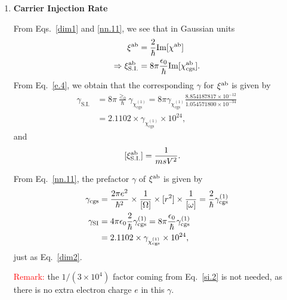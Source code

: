 \documentclass[12pt]{article}
\numberwithin{equation}{section}
\begin{document}
\begin{enumerate}
\item {\bf Carrier Injection Rate}

From Eqs.~\eqref{dim1} and \eqref{nn.11}, we see that 
in Gaussian units
 \begin{align}\label{dim2}
\xi^{\mathrm{a}\mathrm{b}}
&=\frac{2}{\hbar}\mathrm{Im}[\chi^{\mathrm{a}\mathrm{b}}]
\nonumber\\
\Rightarrow  
\xi^{\mathrm{a}\mathrm{b}}_{\mathrm{S.I.}}
&=8\pi\frac{\epsilon_0}{\hbar}\mathrm{Im}[\chi^{\mathrm{a}\mathrm{b}}_{\mathrm{cgs}}]
. 
\end{align}   
From Eq.~\eqref{e.4}, we obtain that the corresponding $\gamma$ for 
$\xi^{\mathrm{a}\mathrm{b}}$ is given by
 \begin{align}\label{dim2}
\gamma _{\mathrm{S.I.}}
&=8\pi\frac{\ge_0}{\hbar}
\gamma_{\chi^{(1)}_{\mathrm{cgs}}} 
=
8\pi\gamma_{\chi^{(1)}_{\mathrm{cgs}}} \frac{8.854 187 817 \times 10^{-12}}{1.054571800\times 10^{-34}}
\nonumber\\
&=
2.1102 \times  
\gamma_{\chi^{(1)}_{\mathrm{cgs}}} 
\times 10^{24}
, 
\end{align} 
and 
 \begin{align}\label{dim21}
[\xi^{\mathrm{a}\mathrm{b}}_{\mathrm{S.I.}}]
&=
\frac{1}{msV^2}
. 
\end{align}  

From Eq.~\eqref{nn.11}, the prefactor $\gamma$ of $\xi^{\mathrm{a}\mathrm{b}}$ is given by 
\begin{align}\label{ne.4nn}
\gamma_{\mathrm{cgs}} 
&=
\frac{2\pi e^2}{\hbar^2}\times\frac{1}{[\Omega]}
\times [r^2] \times \frac{1}{[\omega]}
=\frac{2}{\hbar}
\gamma^{(1)}_{\mathrm{cgs}}
\nonumber\\
\gamma_{\mathrm{SI}} 
&=4\pi\epsilon_0\frac{2}{\hbar}
\gamma^{(1)}_{\mathrm{cgs}}
=8\pi\frac{\epsilon_0}{\hbar}
\gamma^{(1)}_{\mathrm{cgs}}
\nonumber\\
&=
2.1102 \times  
\gamma_{\chi^{(1)}_{\mathrm{cgs}}} 
\times 10^{24}
,
\end{align}
just as Eq.~\eqref{dim2}.

\textcolor{red}{Remark:} the $1/(3\times 10^4)$ factor coming from 
Eq.~\eqref{si.2} is not needed, as there is no extra electron charge $e$ in 
this $\gamma$. 



\end{enumerate}
\end{document}

